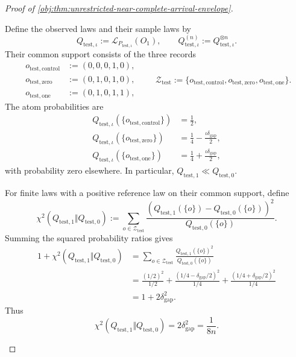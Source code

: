\begin{proof}[Proof of \cref{obj:thm:unrestricted-near-complete-arrival-envelope}]
\begin{enumerate}
Define the observed laws and their sample laws by
\[
Q_{\mathrm{test},\iota}
:=\mathcal L_{P_{\mathrm{test},\iota}}(O_1),
\qquad
Q_{\mathrm{test},\iota}^{(n)}
:=Q_{\mathrm{test},\iota}^{\otimes n}.
\]
Their common support consists of the three records
\[
\begin{aligned}
o_{\mathrm{test},\mathrm{control}}&:=(0,0,0,1,0),\\
o_{\mathrm{test},\mathrm{zero}}&:=(0,1,0,1,0),\\
o_{\mathrm{test},\mathrm{one}}&:=(0,1,0,1,1),
\end{aligned}
\qquad
\mathcal Z_{\mathrm{test}}
:=
\{o_{\mathrm{test},\mathrm{control}},
o_{\mathrm{test},\mathrm{zero}},
o_{\mathrm{test},\mathrm{one}}\}.
\]
The atom probabilities are
\[
\begin{aligned}
Q_{\mathrm{test},\iota}(\{o_{\mathrm{test},\mathrm{control}}\})&=\frac12,\\
Q_{\mathrm{test},\iota}(\{o_{\mathrm{test},\mathrm{zero}}\})&=\frac14-\frac{\iota\delta_{\mathrm{gap}}}{2},\\
Q_{\mathrm{test},\iota}(\{o_{\mathrm{test},\mathrm{one}}\})&=\frac14+\frac{\iota\delta_{\mathrm{gap}}}{2},
\end{aligned}
\]
with probability zero elsewhere. In particular,
\(Q_{\mathrm{test},1}\ll Q_{\mathrm{test},0}\).

For finite laws with a positive reference law on their common support, define
\[
\chi^2(Q_{\mathrm{test},1}\Vert Q_{\mathrm{test},0})
:=
\sum_{o\in\mathcal Z_{\mathrm{test}}}
\frac{
\left(Q_{\mathrm{test},1}(\{o\})-Q_{\mathrm{test},0}(\{o\})\right)^2
}{
Q_{\mathrm{test},0}(\{o\})
}.
\]
Summing the squared probability ratios gives
\[
\begin{aligned}
1+\chi^2(Q_{\mathrm{test},1}\Vert Q_{\mathrm{test},0})
&=
\sum_{o\in\mathcal Z_{\mathrm{test}}}
\frac{Q_{\mathrm{test},1}(\{o\})^2}{Q_{\mathrm{test},0}(\{o\})}\\
&=
\frac{(1/2)^2}{1/2}
+
\frac{(1/4-\delta_{\mathrm{gap}}/2)^2}{1/4}
+
\frac{(1/4+\delta_{\mathrm{gap}}/2)^2}{1/4}\\
&=1+2\delta_{\mathrm{gap}}^2.
\end{aligned}
\]
Thus
\[
\chi^2(Q_{\mathrm{test},1}\Vert Q_{\mathrm{test},0})
=2\delta_{\mathrm{gap}}^2=\frac1{8n}.
\]


\end{enumerate}
\end{proof}
